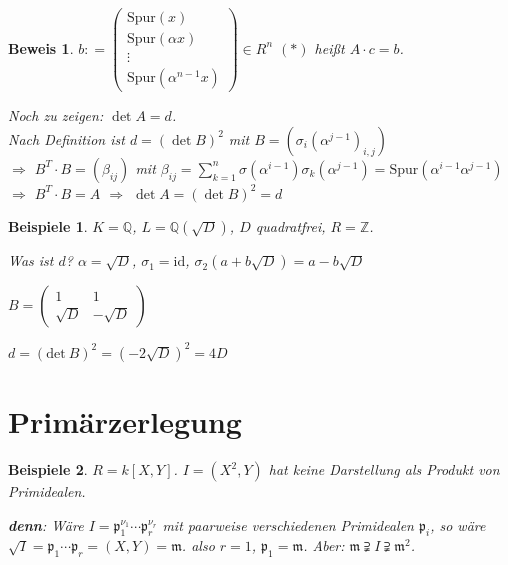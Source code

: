 \documentclass[a4paper,12pt]{scrbook}
\theoremstyle{break}
\theoremstyle{nonumberbreak}
\newtheorem{Bew}{Beweis}
\newtheorem{nnBsp}{Beispiele}
\theoremstyle{nonumberplain}
\newcommand{\defeqr}[0]{\mathrel{\mathop:}=}
\begin{document}
\begin{Bew}
$b \defeqr
\begin{pmatrix}
  \text{Spur}(x) \\
  \text{Spur}(\alpha x) \\
  \vdots \\
  \text{Spur}(\alpha^{n-1}x)
\end{pmatrix} \in R^n$ $(*)$ heißt $A \cdot c = b$.

Noch zu zeigen: $\det A = d$.\\
Nach Definition ist $d = (\det B)^2$ mit $B = (\sigma_i(\alpha^{j-1})_{i,j})$\\
$\Rightarrow$ $B^T \cdot B = (\beta_{ij})$ mit $\beta_{ij} = \sum_{k=1}^n \sigma(\alpha^{i-1}) \sigma_k(\alpha^{j-1}) = \text{Spur}(\alpha^{i-1} \alpha^{j-1})$\\
$\Rightarrow$ $B^T \cdot B = A$ $\Rightarrow$ $\det A = (\det B)^2 = d$
\end{Bew}

\begin{nnBsp}
$K=\mathbb{Q}$, $L=\mathbb{Q}(\sqrt{D})$, $D$ quadratfrei, $R=\mathbb{Z}$.

Was ist $d$? $\alpha = \sqrt{D}$, $\sigma_1=\textrm{id}$, $\sigma_2(a+b\sqrt{D})=a-b\sqrt{D}$

$B=\left(\begin{array}{cc}1&1\\\sqrt{D}&-\sqrt{D}\end{array}\right)$

$d=(\textrm{det}\ B)^2=(-2\sqrt{D})^2=4D$

\end{nnBsp}
\section{Primärzerlegung}

\begin{nnBsp}
$R = k[X,Y]$. $I = (X^2, Y)$ hat keine Darstellung als Produkt von Primidealen.

\textbf{denn}: Wäre $I = \mathfrak{p}_1^{\nu_1} \cdots \mathfrak{p}_r^{\nu_r}$ mit paarweise verschiedenen Primidealen $\mathfrak{p}_i$, so wäre $\sqrt{I} = \mathfrak{p}_1 \cdots \mathfrak{p}_r = (X,Y) = \mathfrak{m}$. also $r = 1$, $\mathfrak{p}_1 = \mathfrak{m}$. Aber: $\mathfrak{m} \supsetneqq I \supsetneqq \mathfrak{m}^2$.

\end{nnBsp}
\end{document}
